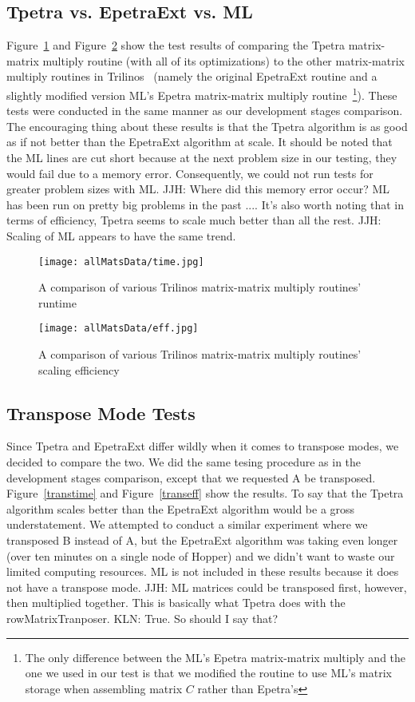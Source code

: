 \documentclass{article}
\newcommand{\JJH}[1]{\textcolor{jhuGreen}{JJH: #1}}
\newcommand{\KLN}[1]{\textcolor{klnBlue}{KLN: #1}}
\begin{document}
\subsection{Tpetra vs. EpetraExt vs. ML}
Figure~\ref{alltime} and Figure~\ref{alleff} show the test results of comparing the Tpetra matrix-matrix multiply routine 
(with all of its optimizations) to the other matrix-matrix multiply routines in Trilinos~\cite{1089021} (namely the original EpetraExt 
routine and a slightly modified version ML's Epetra matrix-matrix multiply routine~\footnote{The only difference between the ML's Epetra matrix-matrix
multiply and the one we used in our test is that we modified the routine to use ML's matrix storage when assembling matrix $C$ rather than Epetra's}). 
These tests were conducted in the same manner as our development stages comparison. 
The encouraging thing about these results is that the Tpetra algorithm is as good as if not better than the EpetraExt 
algorithm at scale. It should be noted that the ML lines are cut short because at the next problem size in our testing, 
they would fail due to a memory error. Consequently, we could not run tests for greater problem sizes with ML. 
\JJH{Where did this memory error occur?  ML has been run on pretty big problems in the past ....}
It's also worth noting that in terms of efficiency, Tpetra seems to scale much better than all the rest.
\JJH{Scaling of ML appears to have the same trend.}

\begin{figure}
\texttt{[image: allMatsData/time.jpg]}
\caption[Time Comparison]{A comparison of various Trilinos matrix-matrix multiply routines' runtime}
\label{alltime}
\end{figure}

\begin{figure}
\texttt{[image: allMatsData/eff.jpg]}
\caption[Efficiency Comparison]{A comparison of various Trilinos matrix-matrix multiply routines' scaling efficiency}
\label{alleff}
\end{figure}

\subsection{Transpose Mode Tests}
Since Tpetra and EpetraExt differ wildly when it comes to transpose modes, we decided to compare the two. We did the same
tesing procedure as in the development stages comparison, except that we requested A be transposed. Figure~\ref{transtime}
and Figure~\ref{transeff} show the results. To say that the Tpetra algorithm scales better than the EpetraExt algorithm
would be a gross understatement. We attempted to conduct a similar experiment where we transposed B instead of A, 
but the EpetraExt algorithm was taking even longer (over ten minutes on a single node of Hopper) and we didn't want to 
waste our limited computing resources. ML is not included in these results because it does not have a transpose mode.
\JJH{ML matrices could be transposed first, however, then multiplied together.  This is basically what Tpetra does with
the rowMatrixTranposer.}
\KLN{True. So should I say that?}
\end{document}
